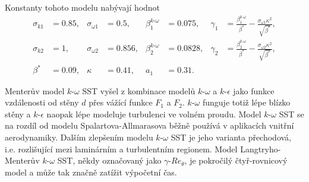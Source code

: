 Konstanty tohoto modelu nabývají hodnot
\begin{align*}
\sigma_{k1} &= 0.85,  &\sigma_{\omega 1} &= 0.5,  &\beta_1^{k\text{-}\omega} &= 0.075,  &\gamma_1 &= \frac{\beta_1^{k\text{-}\omega}}{\beta^\ast} - \frac{\sigma_{\omega 1}\kappa^2}{\sqrt{\beta^\ast}},\\
\sigma_{k2} &= 1,  &\sigma_{\omega 2} &= 0.856,  &\beta_2^{k\text{-}\omega} &= 0.0828,  &\gamma_2 &= \frac{\beta_2^{k\text{-}\omega}}{\beta^\ast} - \frac{\sigma_{\omega 2}\kappa^2}{\sqrt{\beta^\ast}},\\
\beta^\ast &= 0.09,  &\kappa &= 0.41,  &a_1 &= 0.31.
\end{align*} 

Menterův model $ k\text{-}\omega $ SST vyšel z kombinace modelů $ k\text{-}\omega $ a $ k\text{-}\epsilon $ jako funkce vzdálenosti od stěny $ d $ přes vážící funkce $ F_1 $ a $ F_2 $. $ k\text{-}\omega $ funguje totiž lépe blízko stěny a $ k\text{-}\epsilon $ naopak lépe modeluje turbulenci ve volném proudu. Model $ k\text{-}\omega $ SST se na rozdíl od modelu Spalartova-Allmarasova běžně používá v aplikacích vnitřní aerodynamiky. Dalším zlepšením modelu $ k\text{-}\omega $ SST je jeho varianta přechodová, i.e. rozlišující mezi laminárním a turbulentním regionem. Model Langtryho-Menterův $ k\text{-}\omega $ SST, někdy označovaný jako $ \gamma\text{-}Re_\theta $, je pokročilý čtyř-rovnicový model a může tak značně zatížit výpočetní čas.

